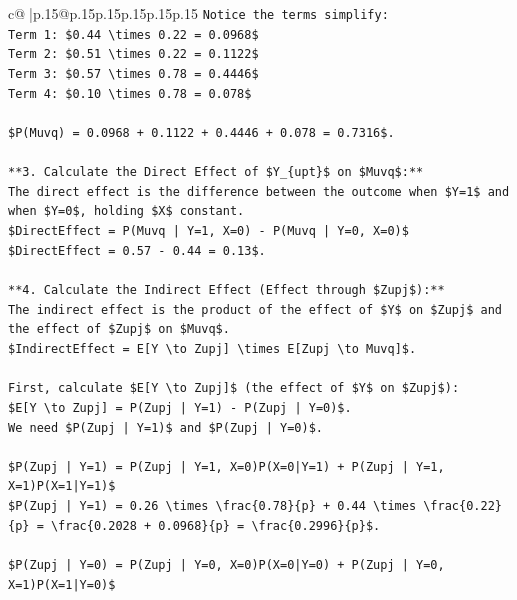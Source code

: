 \documentclass{article}
\begin{document}
{\begin{supertabular}{c@{$\;$}|p{.15\linewidth}@{}p{.15\linewidth}p{.15\linewidth}p{.15\linewidth}p{.15\linewidth}p{.15\linewidth}}
{{{\texttt{Notice the terms simplify:} \\
\texttt{Term 1: \$0.44 \textbackslash{}times 0.22 = 0.0968\$} \\
\texttt{Term 2: \$0.51 \textbackslash{}times 0.22 = 0.1122\$} \\
\texttt{Term 3: \$0.57 \textbackslash{}times 0.78 = 0.4446\$} \\
\texttt{Term 4: \$0.10 \textbackslash{}times 0.78 = 0.078\$} \\
\\ 
\texttt{\$P(Muvq) = 0.0968 + 0.1122 + 0.4446 + 0.078 = 0.7316\$.} \\
\\ 
\texttt{**3. Calculate the Direct Effect of \$Y\_\{upt\}\$ on \$Muvq\$:**} \\
\texttt{The direct effect is the difference between the outcome when \$Y=1\$ and when \$Y=0\$, holding \$X\$ constant.} \\
\texttt{\$DirectEffect = P(Muvq | Y=1, X=0) {-} P(Muvq | Y=0, X=0)\$} \\
\texttt{\$DirectEffect = 0.57 {-} 0.44 = 0.13\$.} \\
\\ 
\texttt{**4. Calculate the Indirect Effect (Effect through \$Zupj\$):**} \\
\texttt{The indirect effect is the product of the effect of \$Y\$ on \$Zupj\$ and the effect of \$Zupj\$ on \$Muvq\$.} \\
\texttt{\$IndirectEffect = E{[}Y \textbackslash{}to Zupj{]} \textbackslash{}times E{[}Zupj \textbackslash{}to Muvq{]}\$.} \\
\\ 
\texttt{First, calculate \$E{[}Y \textbackslash{}to Zupj{]}\$ (the effect of \$Y\$ on \$Zupj\$):} \\
\texttt{\$E{[}Y \textbackslash{}to Zupj{]} = P(Zupj | Y=1) {-} P(Zupj | Y=0)\$.} \\
\texttt{We need \$P(Zupj | Y=1)\$ and \$P(Zupj | Y=0)\$.} \\
\\ 
\texttt{\$P(Zupj | Y=1) = P(Zupj | Y=1, X=0)P(X=0|Y=1) + P(Zupj | Y=1, X=1)P(X=1|Y=1)\$} \\
\texttt{\$P(Zupj | Y=1) = 0.26 \textbackslash{}times \textbackslash{}frac\{0.78\}\{p\} + 0.44 \textbackslash{}times \textbackslash{}frac\{0.22\}\{p\} = \textbackslash{}frac\{0.2028 + 0.0968\}\{p\} = \textbackslash{}frac\{0.2996\}\{p\}\$.} \\
\\ 
\texttt{\$P(Zupj | Y=0) = P(Zupj | Y=0, X=0)P(X=0|Y=0) + P(Zupj | Y=0, X=1)P(X=1|Y=0)\$} \\
}}}
\end{supertabular}}
\end{document}
